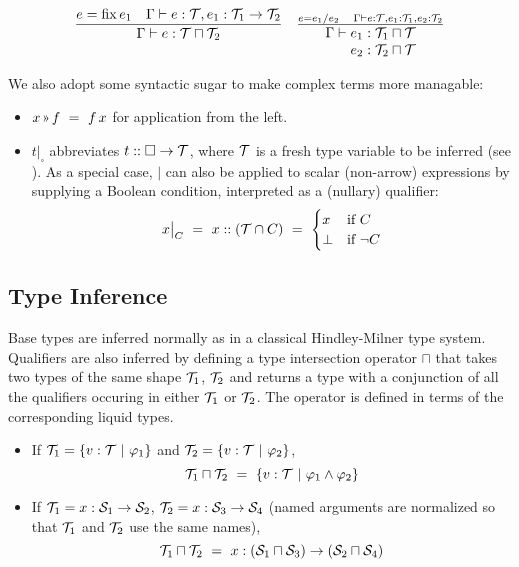 \begin{figure*}
\[
\begin{array}{ll}
  \displaystyle
  \frac{e=\fix e_1 \quad \Gamma\vdash e:\T, e_1:\T_1\to\T_2}
       {\Gamma\vdash e: \T\sqcap\T_2} &
  \frac{e=e_1/e_2 \quad \Gamma\vdash e:\T, e_1:\T_1, e_2:\T_2}
       {\begin{array}{@{}l@{}l@{}}\Gamma\vdash{} & e_1:\T_1\sqcap\T \\ & e_2:\T_2\sqcap\T\end{array}}
\end{array}
\]
\caption{\label{lang:type refinement for operators}}
\end{figure*}


We also adopt some syntactic sugar to make complex terms more managable:

\begin{itemize}
  \item $x \applt f ~=~ f\,x$ for application from the left.
  \item $t\big|_{\square}$ abbreviates $t::\square\to\mathcal{T}$, where $\mathcal{T}$ is a fresh type variable
    to be inferred (see ). As a special case, $\big|$ can also be applied
    to scalar (non-arrow) expressions by supplying a Boolean condition,
    interpreted as a (nullary) qualifier:
    \[x\big|_{C} ~=~ x :: (\mathcal{T}\cap C) ~=~ \begin{cases}x & \mbox{if }C \\ \bot & \mbox{if }\lnot C\end{cases}\]
\end{itemize}

\subsection{Type Inference}
\label{lang:type inf}

Base types are inferred normally as in a classical Hindley-Milner type system.
Qualifiers are also inferred by defining a type intersection operator $\sqcap$ that
takes two types of the same shape $\mathcal{T}_1$, $\mathcal{T}_2$ and returns a type with a conjunction of all the qualifiers
occuring in either $\mathcal{T}_1$ or $\mathcal{T}_2$. The operator is defined in terms of the corresponding liquid types.
\begin{itemize}
  \item If $\mathcal{T}_1=\{v:\mathcal{T} ~|~ \varphi_1\}$ and $\mathcal{T}_2=\{v:\mathcal{T} ~|~ \varphi_2\}$,
	\[\mathcal{T}_1\sqcap\mathcal{T}_2 ~=~ \{v:\mathcal{T} ~|~ \varphi_1\land\varphi_2\}\]
  \item If $\mathcal{T}_1=x:\mathcal{S}_1\to\mathcal{S}_2$, $\mathcal{T}_2=x:\mathcal{S}_3\to\mathcal{S}_4$ (named arguments are normalized so that $\mathcal{T}_1$ and $\mathcal{T}_2$ use the same names),
    \[\mathcal{T}_1\sqcap\mathcal{T}_2 ~=~ x:(\mathcal{S}_1\sqcap\mathcal{S}_3)\to(\mathcal{S}_2\sqcap\mathcal{S}_4)\]
\end{itemize}

